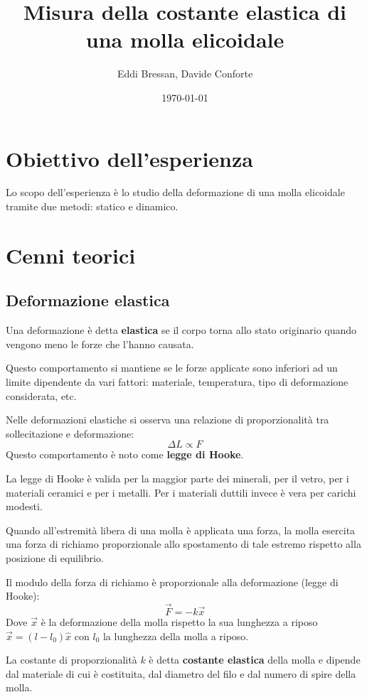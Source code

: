 \documentclass[a4paper,12pt]{article}
\title{Misura della costante elastica di una molla elicoidale}
\author{Eddi Bressan, Davide Conforte}
\date{\today}
\begin{document}
\maketitle
\tableofcontents
\newpage

\section{Obiettivo dell'esperienza}
Lo scopo dell'esperienza è lo studio della deformazione di una molla elicoidale tramite due metodi: statico e dinamico.

\section{Cenni teorici}

\subsection{Deformazione elastica}
Una deformazione è detta \textbf{elastica} se il corpo torna allo stato originario quando
vengono meno le forze che l'hanno causata.

Questo comportamento si mantiene se le forze applicate sono inferiori
ad un limite dipendente da vari fattori: materiale, temperatura, tipo di deformazione considerata, etc.

Nelle deformazioni elastiche si osserva una relazione di proporzionalità tra sollecitazione e deformazione:
$$
\Delta L \propto F
$$
\noindent
Questo comportamento è noto come \textbf{legge di Hooke}.

La legge di Hooke è valida per la maggior parte dei minerali, per il vetro,
per i materiali ceramici e per i metalli. Per i materiali duttili invece è vera per carichi modesti.

Quando all'estremità libera di una molla è applicata una forza,
la molla esercita una forza di richiamo proporzionale allo spostamento di tale 
estremo rispetto alla posizione di equilibrio.

Il modulo della forza di richiamo è proporzionale alla deformazione (legge di Hooke):
$$
\vec{F} = -k \vec{x}
$$
Dove $\vec{x}$ è la deformazione della molla rispetto la sua lunghezza a riposo $\vec{x} = (l - l_{0})\hat{x}$
con $l_0$ la lunghezza della molla a riposo.

La costante di proporzionalità $k$ è detta \textbf{costante elastica} della molla e 
dipende dal materiale di cui è costituita, dal diametro del filo e dal numero di spire della molla.
\end{document}
